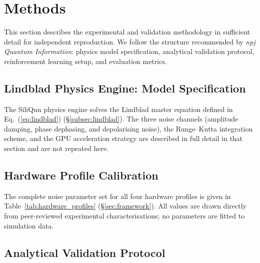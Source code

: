 
\section{Methods}
\label{sec:methods}

This section describes the experimental and validation methodology in sufficient
detail for independent reproduction. We follow the structure recommended by
\emph{npj Quantum Information}: physics model specification, analytical
validation protocol, reinforcement learning setup, and evaluation metrics.

\subsection{Lindblad Physics Engine: Model Specification}
\label{subsec:methods_lindblad}

The SiliQun physics engine solves the Lindblad master equation defined in
Eq.~(\ref{eq:lindblad}) (\S\ref{subsec:lindblad}). The three noise
channels (amplitude damping, phase dephasing, and depolarising noise), the
Runge--Kutta integration scheme, and the GPU acceleration strategy are
described in full detail in that section and are not repeated here.

\subsection{Hardware Profile Calibration}
\label{subsec:methods_profiles}

The complete noise parameter set for all four hardware profiles is given in
Table~\ref{tab:hardware_profiles} (\S\ref{sec:framework}).
All values are drawn directly from peer-reviewed experimental characterisations;
no parameters are fitted to simulation data.

\subsection{Analytical Validation Protocol}
\label{subsec:methods_validation}

